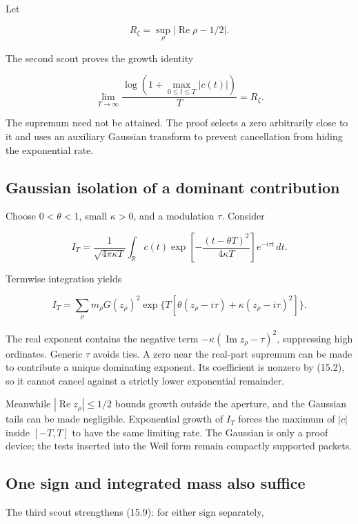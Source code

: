 \documentclass[
  10pt,
  a4paper,
  10pt,
  oneside,
  openany]{book}
\begin{document}
Let

\[
R_\zeta=\sup_\rho|\operatorname{Re}\rho-1/2|.
\tag{15.8}\label{eq:15.8}
\]

The second scout proves the growth identity

\[
\lim_{T\to\infty}
\frac{\log(1+\max_{0\le t\le T}|c(t)|)}{T}=R_\zeta.
\tag{15.9}\label{eq:15.9}
\]

The supremum need not be attained. The proof selects a zero arbitrarily
close to it and uses an auxiliary Gaussian transform to prevent
cancellation from hiding the exponential rate.

\subsection{Gaussian isolation of a dominant
contribution}\label{gaussian-isolation-of-a-dominant-contribution}

Choose \(0<\theta<1\), small \(\kappa>0\), and a modulation \(\tau\).
Consider

\[
I_T=\frac1{\sqrt{4\pi\kappa T}}
\int_{\mathbb R}c(t)
\exp\!\left[-\frac{(t-\theta T)^2}{4\kappa T}\right]
 e^{-i\tau t}\,dt.
\tag{15.10}\label{eq:15.10}
\]

Termwise integration yields

\[
I_T=\sum_\rho m_\rho G(z_\rho)^2
\exp\{T[\theta(z_\rho-i\tau)+\kappa(z_\rho-i\tau)^2]\}.
\tag{15.11}\label{eq:15.11}
\]

The real exponent contains the negative term
\(-\kappa(\operatorname{Im}z_\rho-\tau)^2\), suppressing high ordinates.
Generic \(\tau\) avoids ties. A zero near the real-part supremum can be
made to contribute a unique dominating exponent. Its coefficient is
nonzero by (15.2), so it cannot cancel against a strictly lower
exponential remainder.

Meanwhile \(|\operatorname{Re}z_\rho|\le1/2\) bounds growth outside the
aperture, and the Gaussian tails can be made negligible. Exponential
growth of \(I_T\) forces the maximum of \(|c|\) inside \([-T,T]\) to
have the same limiting rate. The Gaussian is only a proof device; the
tests inserted into the Weil form remain compactly supported packets.

\subsection{One sign and integrated mass also
suffice}\label{one-sign-and-integrated-mass-also-suffice}

The third scout strengthens (15.9): for either sign separately,
\end{document}
